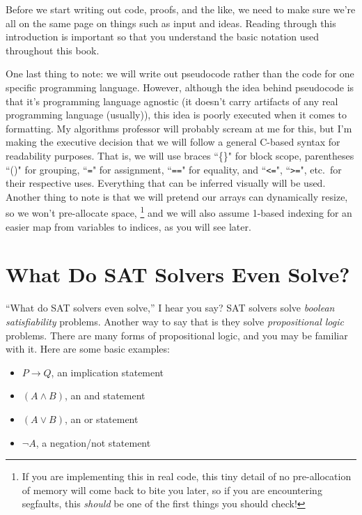 \documentclass[oneside]{book}
\begin{document}
Before we start writing out code, proofs, and the like, we need to make sure we're 
all on the same page on things such as input and ideas. Reading through this 
introduction is important so that you understand the basic notation used throughout this book.

One last thing to note: we will write out pseudocode rather than the code for one specific programming 
language. However, although the idea behind pseudocode is that it's programming 
language agnostic (it doesn't carry artifacts of any real programming language (usually)), 
this idea is poorly executed when it comes to formatting. My algorithms professor will 
probably scream at me for this, but I'm making the executive decision that we will
follow a general C-based syntax for readability purposes. That is, 
we will use braces ``\{\}" for block scope, parentheses ``()" for grouping, ``\verb|=|"
for assignment, ``\verb|==|" for equality, and ``\verb|<=|", ``\verb|>=|", etc.\ for their 
respective uses. Everything that can be inferred visually will be used. Another thing to note is that we will 
pretend our arrays can dynamically resize, so we won't pre-allocate space,
\footnote{If you are implementing this in real code, this tiny detail of no pre-allocation of memory
will come back to bite you later, so if you are encountering segfaults, this \textit{should} be one of the 
first things you should check!}
and we will also assume 1-based  indexing for an easier map from variables to indices,
as you will see later.

\section{What Do SAT Solvers Even Solve?}

``What do SAT solvers even solve,'' I hear you say? SAT solvers solve \textit{boolean satisfiability} problems. 
Another way to say that is they solve \textit{propositional logic} problems. 
There are many forms of propositional logic, and you may be familiar with it. Here are some basic examples:

\begin{itemize}
    \item $P \rightarrow Q$, an implication statement
    \item $(A \land B)$, an and statement
    \item $(A \lor B)$, an or statement
    \item $\neg A$, a negation/not statement
\end{itemize}
\end{document}
